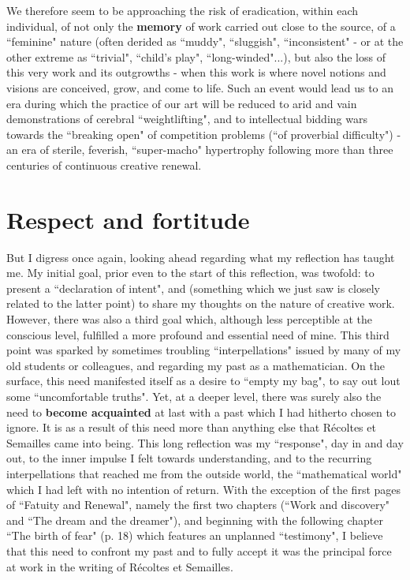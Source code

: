 We therefore seem to be approaching the risk of eradication, within each individual, of not only the \textbf{memory} of work carried out close to the source, of a ``feminine" nature (often derided as ``muddy", ``sluggish", ``inconsistent" - or at the other extreme as ``trivial", ``child's play", ``long-winded"...), but also the loss of this very work and its outgrowths - when this work is where novel notions and visions are conceived, grow, and come to life. Such an event would lead us to an era during which the practice of our art will be reduced to arid and vain demonstrations of cerebral ``weightlifting", and to intellectual bidding wars towards the ``breaking open" of competition problems (``of proverbial difficulty") - an era of sterile, feverish, ``super-macho" hypertrophy following more than three centuries of continuous creative renewal. 

\section{Respect and fortitude}

But I digress once again, looking ahead regarding what my reflection has taught me.  My initial goal, prior even to the start of this reflection, was twofold: to present a ``declaration of intent", and (something which we just saw is closely related to the latter point) to share my thoughts on the nature of creative work. However, there was also a third goal which, although less perceptible at the conscious level, fulfilled a more profound and essential need of mine. This third point was sparked by sometimes troubling ``interpellations" issued by many of my old students or colleagues, and regarding my past as a mathematician. On the surface, this need manifested itself as a desire to ``empty my bag", to say out lout some ``uncomfortable truths". Yet, at a deeper level, there was surely also the need to \textbf{become acquainted} at last with a past which I had hitherto chosen to ignore. It is as a result of this need more than anything else that R\'ecoltes et Semailles came into being. This long reflection was my ``response", day in and day out, to the inner impulse I felt towards understanding, and to the recurring interpellations that reached me from the outside world, the ``mathematical world" which I had left with no intention of return. With the exception of the first pages of ``Fatuity and Renewal", namely the first two chapters (``Work and discovery" and ``The dream and the dreamer"), and beginning with the following chapter ``The birth of fear" (p. 18) which features an unplanned ``testimony", I believe that this need to confront my past and to fully accept it was the principal force at work in the writing of R\'ecoltes et Semailles.

